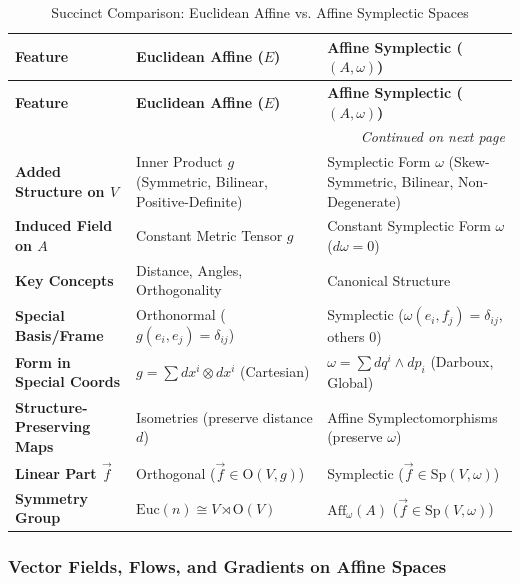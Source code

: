 \begin{longtable}{l|>{\raggedright\arraybackslash}p{5cm}|>{\raggedright\arraybackslash}p{5cm}}
\caption{Succinct Comparison: Euclidean Affine vs. Affine Symplectic Spaces} \label{tab:affine_comparison_succinct} \\
\hline
\textbf{Feature} & \textbf{Euclidean Affine ($E$)} & \textbf{Affine Symplectic ($(A, \omega)$)} \\
\hline \hline
\endfirsthead

\hline
\textbf{Feature} & \textbf{Euclidean Affine ($E$)} & \textbf{Affine Symplectic ($(A, \omega)$)} \\
\hline \hline
\endhead

\hline
\multicolumn{3}{r}{\textit{Continued on next page}} \\
\endfoot

\hline
\endlastfoot

\textbf{Added Structure on $V$} & Inner Product $g$ (Symmetric, Bilinear, Positive-Definite) & Symplectic Form $\omega$ (Skew-Symmetric, Bilinear, Non-Degenerate) \\
\hline
\textbf{Induced Field on $A$} & Constant Metric Tensor $g$ & Constant Symplectic Form $\omega$ ($d\omega=0$) \\
\hline
\textbf{Key Concepts} & Distance, Angles, Orthogonality & Canonical Structure \\
\hline
\textbf{Special Basis/Frame} & Orthonormal ($g(e_i, e_j)=\delta_{ij}$) & Symplectic ($\omega(e_i,f_j)=\delta_{ij}$, others 0) \\
\hline
\textbf{Form in Special Coords} & $g=\sum dx^i \otimes dx^i$ (Cartesian) & $\omega=\sum dq^i \wedge dp_i$ (Darboux, Global) \\
\hline
\textbf{Structure-Preserving Maps} & Isometries (preserve distance $d$) & Affine Symplectomorphisms (preserve $\omega$) \\
\hline
\textbf{Linear Part $\vec{f}$} & Orthogonal ($\vec{f} \in \text{O}(V,g)$) & Symplectic ($\vec{f} \in \text{Sp}(V,\omega)$) \\
\hline
\textbf{Symmetry Group} & $\text{Euc}(n) \cong V \rtimes \text{O}(V)$ & $\text{Aff}_\omega(A)$ ($\vec{f} \in \text{Sp}(V,\omega)$) \\
\end{longtable}

\renewcommand{\arraystretch}{1.0}

\subsubsection{Vector Fields, Flows, and Gradients on Affine Spaces}
\label{sec:vf_flows_gradients}


